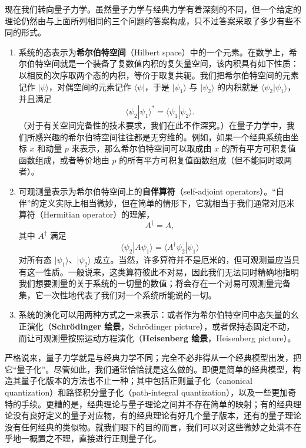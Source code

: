 现在我们转向量子力学。虽然量子力学与经典力学有着深刻的不同，但一个给定的理论仍然由与上面所列相同的三个问题的答案构成，只不过答案采取了多少有些不同的形式。

\begin{enumerate}
\item 系统的态表示为\textbf{希尔伯特空间}（Hilbert space）中的一个元素。在数学上，希尔伯特空间就是一个装备了复数值内积的复矢量空间，该内积具有如下性质：以相反的次序取两个态的内积，等价于取复共轭。我们把希尔伯特空间的元素记作 $|\psi\rangle$，对偶空间的元素记作 $\langle\psi|$，于是 $|\psi_1\rangle$ 与 $|\psi_2\rangle$ 的内积就是 $\langle\psi_2|\psi_1\rangle$，并且满足
\begin{equation*}
\langle\psi_2|\psi_1\rangle^{*} = \langle\psi_1|\psi_2\rangle.
\tag{9.10}
\end{equation*}
（对于有关空间完备性的技术要求，我们在此不作深究。）在量子力学中，我们所感兴趣的希尔伯特空间往往都是无穷维的。例如，如果一个经典系统由坐标 $x$ 和动量 $p$ 来表示，那么希尔伯特空间可以取成由 $x$ 的所有平方可积复值函数组成，或者等价地由 $p$ 的所有平方可积复值函数组成（但不能同时取两者）。
\item 可观测量表示为希尔伯特空间上的\textbf{自伴算符}（self-adjoint operators）。“自伴”的定义实际上相当微妙，但在简单的情形下，它就相当于我们通常对厄米算符（Hermitian operator）的理解，
\begin{equation*}
A^{\dagger} = A,
\tag{9.11}
\end{equation*}
其中 $A^{\dagger}$ 满足
\begin{equation*}
\langle\psi_2|A\psi_1\rangle = \langle A^{\dagger}\psi_2|\psi_1\rangle
\tag{9.12}
\end{equation*}
对所有态 $|\psi_1\rangle$、$|\psi_2\rangle$ 成立。当然，许多算符并不是厄米的，但可观测量应当具有这一性质。一般说来，这类算符彼此不对易，因此我们无法同时精确地指明我们想要测量的关于系统的一切量的数值；将会存在一个对易可观测量完备集，它一次性地代表了我们对一个系统所能说的一切。
\item 系统的演化可以用两种方式之一来表示：或者作为希尔伯特空间中态矢量的幺正演化（\textbf{Schrödinger 绘景}，Schrödinger picture），或者保持态固定不动，而让可观测量按照运动方程演化（\textbf{Heisenberg 绘景}，Heisenberg picture）。
\end{enumerate}

严格说来，量子力学就是与经典力学不同；完全不必非得从一个经典模型出发，把它“量子化”。尽管如此，我们通常恰恰就是这么做的。即便是简单的经典模型，构造其量子化版本的方法也不止一种；其中包括正则量子化（canonical quantization）和路径积分量子化（path-integral quantization），以及一些更加奇特的手续。更糟的是，经典理论与量子理论之间并不存在简单的映射；有的经典理论没有良好定义的量子对应物，有的经典理论有好几个量子版本，还有的量子理论没有任何经典的类似物。就我们眼下的目的而言，我们可以对这些微妙之处满不在乎地一概置之不理，直接进行正则量子化。


